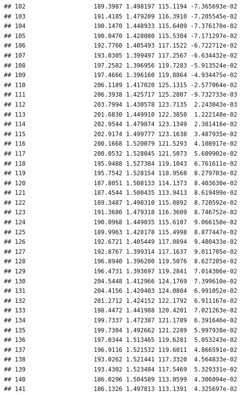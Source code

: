 \documentclass[
]{article}
\begin{document}
\begin{verbatim}
## 102                   189.3987 1.498197 115.1194 -7.365693e-02
## 103                   191.4185 1.479209 116.3910 -7.205545e-02
## 104                   190.1470 1.448933 115.6409 -7.376170e-02
## 105                   190.0470 1.428080 115.5304 -7.171297e-02
## 106                   192.7760 1.405493 117.1522 -6.722712e-02
## 107                   193.0305 1.399497 117.2567 -6.634432e-02
## 108                   197.2582 1.396956 119.7283 -5.913524e-02
## 109                   197.4666 1.396160 119.8864 -4.934475e-02
## 110                   206.1189 1.417020 125.1315 -2.577064e-02
## 111                   206.3938 1.425717 125.2807 -9.732733e-03
## 112                   203.7994 1.430578 123.7135  2.243043e-03
## 113                   201.6830 1.449910 122.3850  1.222148e-02
## 114                   202.9544 1.479874 123.1349  2.381416e-02
## 115                   202.9174 1.499777 123.1638  3.487935e-02
## 116                   200.1668 1.520079 121.5293  4.108917e-02
## 117                   200.0532 1.528045 121.5073  5.609902e-02
## 118                   195.9488 1.527384 119.1043  6.761611e-02
## 119                   195.7542 1.528154 118.9568  8.279703e-02
## 120                   187.8051 1.508133 114.1373  8.403630e-02
## 121                   187.4544 1.500435 113.9413  8.619499e-02
## 122                   189.3487 1.498310 115.0892  8.720592e-02
## 123                   191.3686 1.479318 116.3609  8.746752e-02
## 124                   190.0968 1.449035 115.6107  9.066150e-02
## 125                   189.9963 1.428178 115.4998  8.877447e-02
## 126                   192.6721 1.405449 117.0894  9.480433e-02
## 127                   192.8767 1.399314 117.1637  9.011705e-02
## 128                   196.8940 1.396200 119.5076  8.627205e-02
## 129                   196.4731 1.393697 119.2841  7.014306e-02
## 130                   204.5448 1.412966 124.1769  7.399610e-02
## 131                   204.4156 1.420403 124.0804  6.991052e-02
## 132                   201.2712 1.424152 122.1792  6.911167e-02
## 133                   198.4472 1.441988 120.4201  7.021263e-02
## 134                   199.7337 1.472387 121.1789  6.391646e-02
## 135                   199.7304 1.492662 121.2289  5.997938e-02
## 136                   197.0344 1.513465 119.6281  5.053243e-02
## 137                   196.9116 1.521532 119.6011  4.866591e-02
## 138                   193.0262 1.521441 117.3320  4.564833e-02
## 139                   193.4302 1.523484 117.5469  5.329331e-02
## 140                   186.0296 1.504589 113.0599  4.306094e-02
## 141                   186.1326 1.497813 113.1391  4.325697e-02

\end{verbatim}
\end{document}
